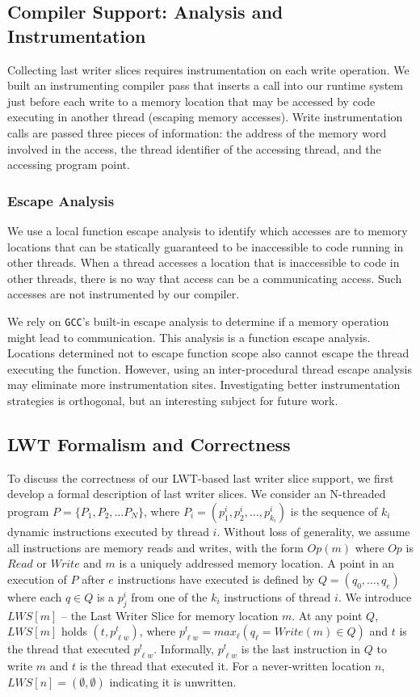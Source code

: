 \documentclass[preprint,9pt]{sigplanconf}
\newcommand{\lwt}{LWT\xspace}
\begin{document}
\subsection{Compiler Support: Analysis and Instrumentation}
Collecting last writer slices requires instrumentation on each write operation.
We built an instrumenting compiler pass that inserts a call into our runtime
system just before each write to a memory location that may be accessed by code
executing in another thread (escaping memory accesses).  Write instrumentation
calls are passed three pieces of information: the address of the memory word
involved in the access, the thread identifier of the accessing thread, and the
accessing program point.   

\subsubsection{Escape Analysis}
We use a local function escape analysis to identify which accesses are to
memory locations that can be statically guaranteed to be inaccessible to code
running in other threads.  When a thread accesses a location that is
inaccessible to code in other threads, there is no way that access can be a
communicating access.  Such accesses are not instrumented by our compiler.  

We rely on {\tt GCC}'s built-in escape analysis to determine if a memory
operation might lead to communication.  This analysis is a function escape
analysis.  Locations determined not to escape function scope also cannot escape
the thread executing the function.  However, using an inter-procedural thread
escape analysis may eliminate more instrumentation sites.  Investigating better
instrumentation strategies is orthogonal, but an interesting subject for future
work.

\subsection{\lwt Formalism and Correctness}
\label{sec:lwssoundness}
To discuss the correctness of our \lwt-based last writer slice support, we
first develop a formal description of last writer slices.  We consider an
N-threaded program $P = \{P_1, P_2, \ldots P_N\}$, where $P_i = (p^{i}_{1},
p^{i}_{2}, \ldots, p^{i}_{k_{i}})$ is the sequence of $k_{i}$ dynamic
instructions executed by thread $i$.  Without loss of generality, we assume all
instructions are memory reads and writes, with the form $Op(m)$ where $Op$ is
$Read$ or $Write$ and $m$ is a uniquely addressed memory location.
A point in an execution of $P$ after $e$ instructions have
executed is defined by $Q = (q_{0}, \ldots, q_{e})$ where each $q \in Q$ is a
$p^{i}_{j}$ from one of the $k_i$ instructions of thread $i$.  We introduce
$LWS[m]$ -- the Last Writer Slice for memory location $m$.   At any point $Q$,
$LWS[m]$ holds $(t,p^{t}_{\ell w})$, where $p^{t}_{\ell w} = max_{\ell}( 
q_{\ell} = Write(m) \in Q)$ and $t$ is the thread that
executed $p^{t}_{\ell w}$. Informally, $p^{t}_{\ell w}$ is the last instruction
in $Q$ to write $m$ and $t$ is the thread that executed it.  For a
never-written location $n$, $LWS[n] = (\emptyset,\emptyset)$ indicating it is
unwritten.
\end{document}
